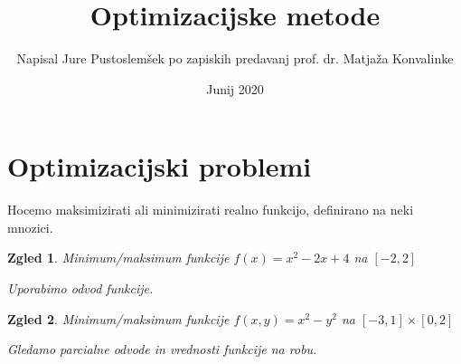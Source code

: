 \documentclass[11pt, a4paper]{article}
\begin{document}
    \newtheorem{theorem}{Izrek}[section]
    \newtheorem{definition}[theorem]{Definicija}
    \newtheorem{corollary}[theorem]{Posledica}
    \newtheorem{lemma}[theorem]{Lema}
    \newtheorem{proposition}[theorem]{Trditev}
    \newtheorem{example}[theorem]{Zgled}

    \newtheorem*{remark}{Opomba}


    \title{Optimizacijske metode}
    \author{Napisal Jure Pustoslemšek po zapiskih predavanj prof. dr. Matjaža Konvalinke}
    \date{Junij 2020}
    \maketitle

    \section{Optimizacijski problemi}

    Hocemo maksimizirati ali minimizirati realno funkcijo, definirano na neki mnozici.

        \begin{example}
            Minimum/maksimum funkcije \(f(x)=x^2-2x+4\) na \([-2,2]\)
            \par
            Uporabimo odvod funkcije.
        \end{example}

        \begin{example}
            Minimum/maksimum funkcije \(f(x,y)=x^2-y^2\) na \([-3,1]\times[0,2]\)
            \par
            Gledamo parcialne odvode in vrednosti funkcije na robu.
        \end{example}
\end{document}
